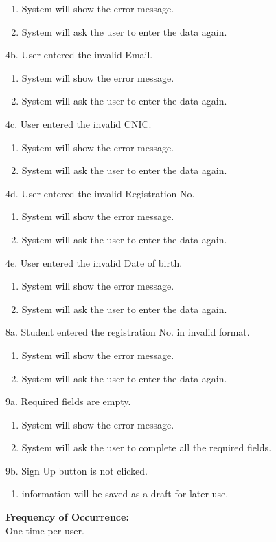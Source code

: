 \documentclass[12pt]{article}
\begin{document}
\begin{enumerate}
\item System will show the error message.
\item System will ask the user to enter the data again.
\end{enumerate}
4b. User entered the invalid Email.
\begin{enumerate}
\item System will show the error message.
\item System will ask the user to enter the data again.
\end{enumerate}
4c. User entered the invalid CNIC.
\begin{enumerate}
\item System will show the error message.
\item System will ask the user to enter the data again.
\end{enumerate}
4d. User entered the invalid Registration No.
\begin{enumerate}
\item System will show the error message.
\item System will ask the user to enter the data again.
\end{enumerate}
4e. User entered the invalid Date of birth.
\begin{enumerate}
\item System will show the error message.
\item System will ask the user to enter the data again.
\end{enumerate}
8a. Student entered the registration No. in invalid format.
\begin{enumerate}
\item System will show the error message.
\item System will ask the user to enter the data again.
\end{enumerate}
9a. Required fields are empty.
\begin{enumerate}
\item System will show the error message.
\item System will ask the user to complete all the required fields.
\end{enumerate}
9b. Sign Up button is not clicked.
\begin{enumerate}
\item information will be saved as a draft for later use.
\end{enumerate}
\textbf{Frequency of Occurrence:}\\
One time per user.
\end{document}
